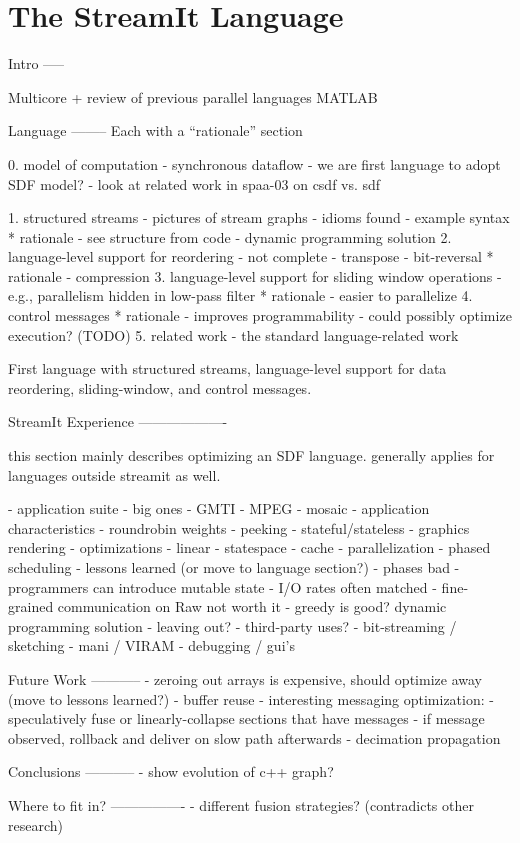 \chapter{The StreamIt Language}
\label{chap:language}

Intro
-----

Multicore + review of previous parallel languages
MATLAB

Language
--------
Each with a ``rationale'' section

0. model of computation
  - synchronous dataflow
  - we are first language to adopt SDF model?
  - look at related work in spaa-03 on csdf vs. sdf


1. structured streams
  - pictures of stream graphs
  - idioms found
  - example syntax
  * rationale
    - see structure from code
    - dynamic programming solution
2. language-level support for reordering
  - not complete
  - transpose
  - bit-reversal
  * rationale
    - compression
3. language-level support for sliding window operations
  - e.g., parallelism hidden in low-pass filter
  * rationale
    - easier to parallelize
4. control messages
  * rationale
    - improves programmability
    - could possibly optimize execution?  (TODO)
5. related work
  - the standard language-related work

First language with structured streams, language-level support for
data reordering, sliding-window, and control messages.

StreamIt Experience
-------------------

this section mainly describes optimizing an SDF language. generally
applies for languages outside streamit as well.

- application suite
  - big ones
    - GMTI
    - MPEG
    - mosaic
  - application characteristics
    - roundrobin weights
    - peeking
    - stateful/stateless
  - graphics rendering
- optimizations
  - linear
  - statespace
  - cache
  - parallelization
  - phased scheduling
- lessons learned (or move to language section?)
  - phases bad
  - programmers can introduce mutable state
  - I/O rates often matched
  - fine-grained communication on Raw not worth it
  - greedy is good?  dynamic programming solution
- leaving out?
  - third-party uses?
    - bit-streaming / sketching
    - mani / VIRAM
  - debugging / gui's

Future Work
-----------
- zeroing out arrays is expensive, should optimize away (move to lessons learned?)
- buffer reuse
- interesting messaging optimization:
  - speculatively fuse or linearly-collapse sections that have messages
  - if message observed, rollback and deliver on slow path afterwards
- decimation propagation

Conclusions
-----------
- show evolution of c++ graph?


Where to fit in?
----------------
- different fusion strategies?  (contradicts other research)
